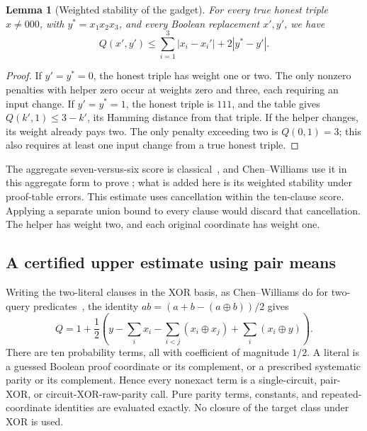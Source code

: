 \documentclass[11pt,letterpaper]{article}
\newtheorem{lemma}[theorem]{Lemma}
\theoremstyle{definition}
\theoremstyle{remark}
\begin{document}
\begin{lemma}[Weighted stability of the gadget]
\label{lem:gadget-stability}
For every true honest triple $x\ne000$, with $y^*=x_1x_2x_3$, and
every Boolean replacement $x',y'$, we have
\[
 Q(x',y')\le\sum_{i=1}^3|x_i-x_i'|+2|y^*-y'|.
\]
\end{lemma}
\begin{proof}
If $y'=y^*=0$, the honest triple has weight one or two. The only
nonzero penalties with helper zero occur at weights zero and three,
each requiring an input change. If $y'=y^*=1$, the honest triple
is $111$, and the table gives $Q(k',1)\le3-k'$, its Hamming distance
from that triple. If the helper changes, its weight already pays two.
The only penalty exceeding two is $Q(0,1)=3$; this also requires at
least one input change from a true honest triple.
\end{proof}

The aggregate seven-versus-six score is classical~\cite{GJS76}, and
Chen--Williams use it in this aggregate form to prove
\cite[Lemma~25]{CW19}; what is added here is its weighted stability
under proof-table errors. This estimate uses cancellation within the
ten-clause score. Applying
a separate union bound to every clause would discard that cancellation.
The helper has weight two, and each original coordinate has weight one.

\subsection{A certified upper estimate using pair means}

Writing the two-literal clauses in the XOR basis, as Chen--Williams
do for two-query predicates~\cite[proof of Theorem~5]{CW19}, the
identity $ab=(a+b-(a\oplus b))/2$ gives
\begin{equation}\label{eq:gadget-pair-identity}
 Q=1+\frac12\left(
 y-\sum_i x_i-\sum_{i<j}(x_i\oplus x_j)
                 +\sum_i(x_i\oplus y)\right).
\end{equation}
There are ten probability terms, all with coefficient of magnitude
$1/2$. A literal is a guessed Boolean proof coordinate or its
complement, or a prescribed systematic parity or its complement. Hence every nonexact
term is a single-circuit, pair-XOR, or circuit-XOR-raw-parity call.
Pure parity terms, constants, and repeated-coordinate identities are
evaluated exactly. No closure of the target class under XOR is used.
\end{document}
